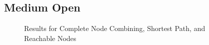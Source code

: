 \documentclass[runningheads]{llncs}
\begin{document}
\subsection{Medium Open}
\begin{figure}[H]
\begin{minipage}{.4\linewidth} 
\caption{Results for Complete Node Combining, Shortest Path, and Reachable Nodes}
\end{minipage}
\hspace{1.5cm}
\begin{minipage}{.4\linewidth} 

\end{minipage}
\end{figure}
\end{document}
